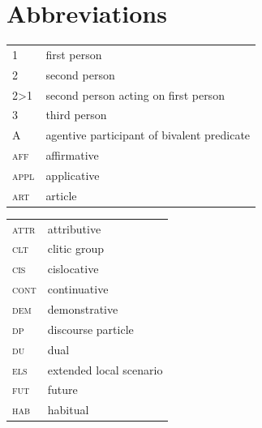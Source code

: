 \documentclass[output=paper,colorlinks,citecolor=brown,draft]{langscibook}
\begin{document}
\section*{Abbreviations}
\begin{tabularx}{.45\textwidth}{lQ}
1 & first person \\
2 & second person \\
2>1 & second person acting on first person\\ 
3 & third person \\
A & agentive participant of bivalent predicate\\  
\textsc{aff} & affirmative\\ 
\textsc{appl} & applicative\\ \textsc{art} & article \\ 
\end{tabularx}
\begin{tabularx}{.45\textwidth}{lQ}
\textsc{attr} & attributive \\
\textsc{clt} & clitic group\\
\textsc{cis} & cislocative\\
\textsc{cont} & continuative\\
\textsc{dem} & demonstrative\\
\textsc{dp} & discourse particle\\
\textsc{du} & dual\\
\textsc{els} & extended local scenario\\
\textsc{fut} & future\\
\textsc{hab} & habitual\\
\end{tabularx}
\end{document}
